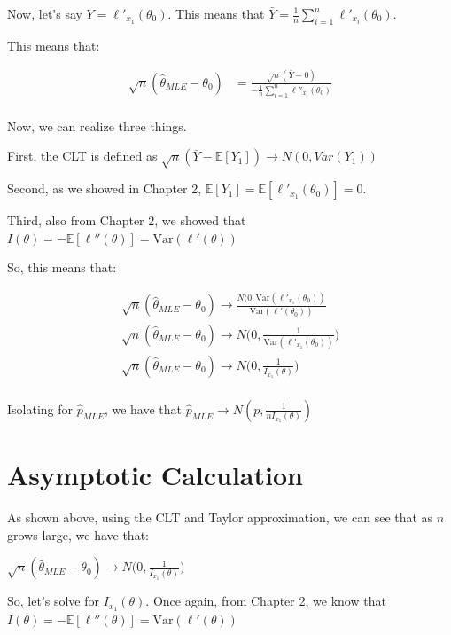 \documentclass[
  letterpaper,
  DIV=11,
  numbers=noendperiod]{scrreprt}
\begin{document}
Now, let's say \(Y = \ell'_{x_1}(\theta_0)\). This means that
\(\bar{Y} = \frac{1}{n} \sum_{i=1}^n \ell'_{x_i}(\theta_0)\).

This means that:

\[
\begin{aligned}
  \sqrt{n}(\hat{\theta}_{MLE} - \theta_0)  &= \frac{\sqrt{n} (\bar{Y} - 0)} {-\frac{1}{n}\sum_{i=1}^n\ell''_{x_i}(\theta_0)} \\ 
\end{aligned}
\]

Now, we can realize three things.

First, the CLT is defined as
\(\sqrt{n}(\bar{Y} - \mathbb{E}[Y_1]) \rightarrow N(0, Var(Y_1))\)

Second, as we showed in Chapter 2,
\(\mathbb{E}[Y_1] = \mathbb{E}[\ell'_{x_1}(\theta_0)] = 0\).

Third, also from Chapter 2, we showed that
\(I(\theta) = -\mathbb{E}[\ell''(\theta)] = \text{Var}(\ell'(\theta))\)

So, this means that:

\[
\begin{aligned}
   \sqrt{n}(\hat{\theta}_{MLE} - \theta_0) \rightarrow \frac{N(0, \text{Var}(\ell'_{x_1}(\theta_0))}{\text{Var}(\ell'(\theta_0))} \\ 
    \sqrt{n}(\hat{\theta}_{MLE} - \theta_0) \rightarrow N \Big(0, \frac{1}{\text{Var}(\ell'_{x_1}(\theta_0))}\Big) \\ 
  \sqrt{n}(\hat{\theta}_{MLE} - \theta_0) \rightarrow N \Big(0, \frac{1}{I_{x_1}(\theta)}\Big) \\ 
\end{aligned}
\]

Isolating for \(\hat{p}_{MLE}\), we have that
\(\hat{p}_{MLE} \rightarrow N\left(p, \frac{1}{nI_{x_1}(\theta)}\right)\)

\section{Asymptotic Calculation}\label{asymptotic-calculation}

As shown above, using the CLT and Taylor approximation, we can see that
as \(n\) grows large, we have that:

\(\sqrt{n}(\hat{\theta}_{MLE} - \theta_0) \rightarrow N \Big(0, \frac{1}{I_{x_1}(\theta)}\Big)\)

So, let's solve for \(I_{x_1}(\theta)\). Once again, from Chapter 2, we
know that
\(I(\theta) = -\mathbb{E}[\ell''(\theta)] = \text{Var}(\ell'(\theta))\)
\end{document}
